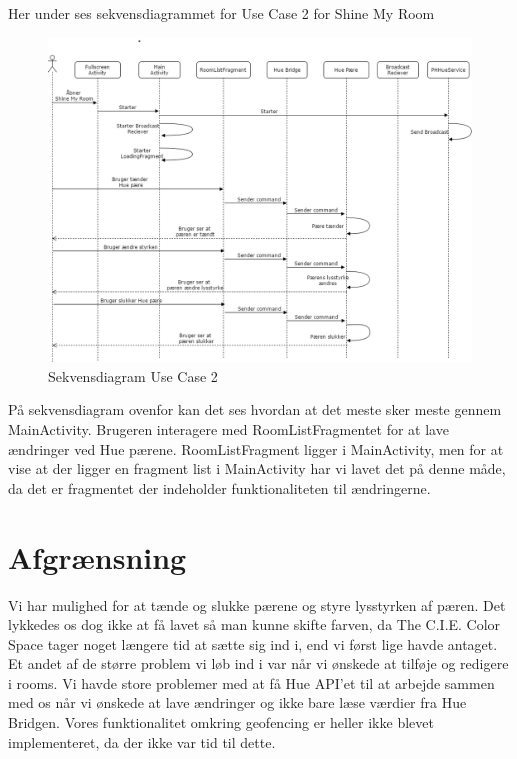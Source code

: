 Her under ses sekvensdiagrammet for Use Case 2 for Shine My Room
\begin{figure}[H]
	\centering
	\includegraphics[width=1\linewidth, height=0.8\linewidth]{Design/SekvensDiagramUC2}
	\caption{Sekvensdiagram Use Case 2}
	\label{fig:SekvensdiagramUC2}
\end{figure}
På sekvensdiagram ovenfor kan det ses hvordan at det meste sker meste gennem MainActivity. Brugeren interagere med RoomListFragmentet for at lave ændringer ved Hue pærene. RoomListFragment ligger i MainActivity, men for at vise at der ligger en fragment list i MainActivity har vi lavet det på denne måde, da det er fragmentet der indeholder funktionaliteten til ændringerne. \\

\section{Afgrænsning}
Vi har mulighed for at tænde og slukke pærene og styre lysstyrken af pæren. Det lykkedes os dog ikke at få lavet så man kunne skifte farven, da The C.I.E. Color Space tager noget længere tid at sætte sig ind i, end vi først lige havde antaget.\\
Et andet af de større problem vi løb ind i var når vi ønskede at tilføje og redigere i rooms. Vi havde store problemer med at få Hue API'et til at arbejde sammen med os når vi ønskede at lave ændringer og ikke bare læse værdier fra Hue Bridgen.
Vores funktionalitet omkring geofencing er heller ikke blevet implementeret, da der ikke var tid til dette.
